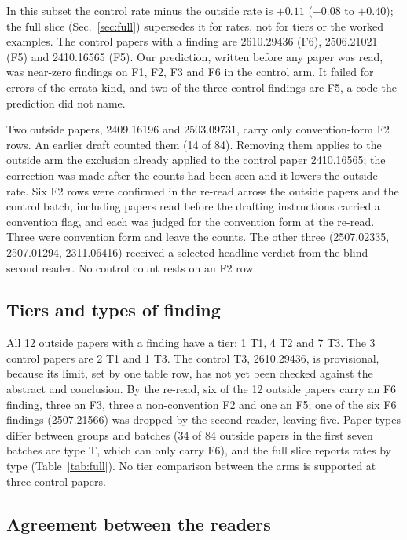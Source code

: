 \documentclass[reprint,amsmath,amssymb,aps,superscriptaddress,nofootinbib]{revtex4-2}
\begin{document}
In this subset the control rate minus the outside rate is $+0.11$ ($-0.08$ to $+0.40$); the full slice (Sec.~\ref{sec:full}) supersedes it for rates, not for tiers or the worked examples. The control papers with a finding are 2610.29436 (F6), 2506.21021 (F5) and 2410.16565 (F5). Our prediction, written before any paper was read, was near-zero findings on F1, F2, F3 and F6 in the control arm. It failed for errors of the errata kind, and two of the three control findings are F5, a code the prediction did not name.

Two outside papers, 2409.16196 and 2503.09731, carry only convention-form F2 rows. An earlier draft counted them (14 of 84). Removing them applies to the outside arm the exclusion already applied to the control paper 2410.16565; the correction was made after the counts had been seen and it lowers the outside rate. Six F2 rows were confirmed in the re-read across the outside papers and the control batch, including papers read before the drafting instructions carried a convention flag, and each was judged for the convention form at the re-read. Three were convention form and leave the counts. The other three (2507.02335, 2507.01294, 2311.06416) received a selected-headline verdict from the blind second reader. No control count rests on an F2 row.

\subsection{Tiers and types of finding}

All 12 outside papers with a finding have a tier: 1 T1, 4 T2 and 7 T3. The 3 control papers are 2 T1 and 1 T3. The control T3, 2610.29436, is provisional, because its limit, set by one table row, has not yet been checked against the abstract and conclusion. By the re-read, six of the 12 outside papers carry an F6 finding, three an F3, three a non-convention F2 and one an F5; one of the six F6 findings (2507.21566) was dropped by the second reader, leaving five. Paper types differ between groups and batches (34 of 84 outside papers in the first seven batches are type T, which can only carry F6), and the full slice reports rates by type (Table~\ref{tab:full}). No tier comparison between the arms is supported at three control papers.

\subsection{Agreement between the readers}
\end{document}
